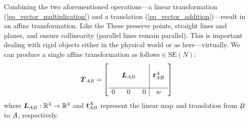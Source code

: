Combining the two aforementioned operations---a linear transformation (\ref{eq_vector_multiplication}) and a translation (\ref{eq_vector_addition})---result in an affine transformation. Like the These preserve points, straight lines and planes, and ensure collinearity (parallel lines remain parallel). This is important dealing with rigid objects either in the physical world or as here---virtually. We can produce a single affine transformation as follows$\in\mathrm{SE}(N)$:
%
\begin{align}\label{eq:T_definition}
\mat{T}_{AB}
= \left[\begin{array}{c c c | c}
& & &   \\
& \mat{L}_{AB}  & & \dvec{t}_{AB}^A \\
& & &  \\\hline
 0 &  0  &  0  &  w
\end{array}\right] 
\end{align}
where $\boldsymbol{L}_{AB}: \mathbb{R}^3 \to \mathbb{R}^3$ and $\boldsymbol{t}_{AB}^A$ represent the linear map and translation from $\udot{B}$ to $\udot{A}$, respectively.







